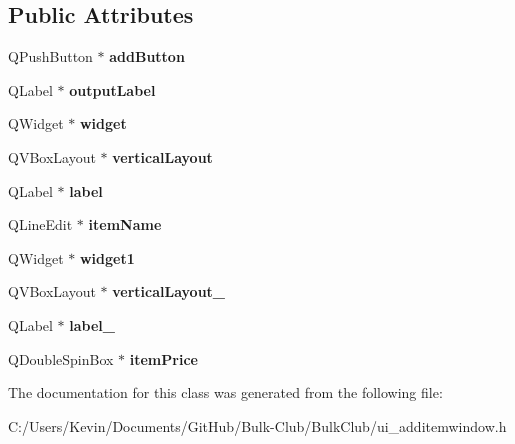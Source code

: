 \subsection*{Public Attributes}
\begin{DoxyCompactItemize}
\item 
\mbox{\label{class_ui__additemwindow_a731562ba062287c725ce6caf9cf06e44}} 
Q\+Push\+Button $\ast$ {\bfseries add\+Button}
\item 
\mbox{\label{class_ui__additemwindow_aba7cdc55e843f57273527781abd45ee6}} 
Q\+Label $\ast$ {\bfseries output\+Label}
\item 
\mbox{\label{class_ui__additemwindow_a9e2437b28a428a8955ab903266f11ecb}} 
Q\+Widget $\ast$ {\bfseries widget}
\item 
\mbox{\label{class_ui__additemwindow_ab5a30b6a2aee0df7ee748dcbb0a1e705}} 
Q\+V\+Box\+Layout $\ast$ {\bfseries vertical\+Layout}
\item 
\mbox{\label{class_ui__additemwindow_acb8eead7207fc2344e3556212cfdfb4b}} 
Q\+Label $\ast$ {\bfseries label}
\item 
\mbox{\label{class_ui__additemwindow_a2ab177f15771e0d662b3039aac8d0613}} 
Q\+Line\+Edit $\ast$ {\bfseries item\+Name}
\item 
\mbox{\label{class_ui__additemwindow_acb95f67b870c6f837b4771816eaaa7e7}} 
Q\+Widget $\ast$ {\bfseries widget1}
\item 
\mbox{\label{class_ui__additemwindow_a24fd88ce242b68d9236528b1dae19288}} 
Q\+V\+Box\+Layout $\ast$ {\bfseries vertical\+Layout\+\_}
\item 
\mbox{\label{class_ui__additemwindow_a41c059aafe0be88821b170d75dd306b5}} 
Q\+Label $\ast$ {\bfseries label\+\_}
\item 
\mbox{\label{class_ui__additemwindow_a0641d9e50c795c39216661d9f52613c7}} 
Q\+Double\+Spin\+Box $\ast$ {\bfseries item\+Price}
\end{DoxyCompactItemize}


The documentation for this class was generated from the following file\+:\begin{DoxyCompactItemize}
\item 
C\+:/\+Users/\+Kevin/\+Documents/\+Git\+Hub/\+Bulk-\/\+Club/\+Bulk\+Club/ui\+\_\+additemwindow.\+h\end{DoxyCompactItemize}

